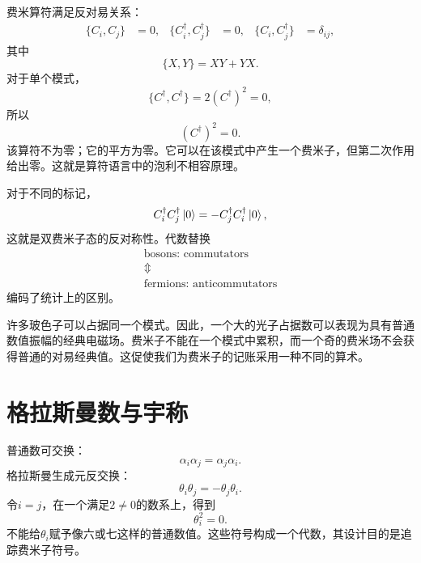 费米算符满足反对易关系：
\begin{align}
\{C_i,C_j\}&=0,&
\{C_i^\dagger,C_j^\dagger\}&=0,&
\{C_i,C_j^\dagger\}&=\delta_{ij},
\end{align}
其中
\begin{equation}
\{X,Y\}=XY+YX.
\end{equation}
对于单个模式，
\begin{equation}
\{C^\dagger,C^\dagger\}=2(C^\dagger)^2=0,
\end{equation}
所以
\begin{equation}
(C^\dagger)^2=0.
\end{equation}
该算符不为零；它的平方为零。它可以在该模式中产生一个费米子，但第二次作用给出零。这就是算符语言中的泡利不相容原理。

对于不同的标记，
\begin{equation}
C_i^\dagger C_j^\dagger\left\lvert0\right\rangle
=-C_j^\dagger C_i^\dagger\left\lvert0\right\rangle,
\end{equation}
这就是双费米子态的反对称性。代数替换
\begin{equation}
\begin{gathered}
\text{bosons: commutators}\\
\Updownarrow\\
\text{fermions: anticommutators}
\end{gathered}
\end{equation}
编码了统计上的区别。

许多玻色子可以占据同一个模式。因此，一个大的光子占据数可以表现为具有普通数值振幅的经典电磁场。费米子不能在一个模式中累积，而一个奇的费米场不会获得普通的对易经典值。这促使我们为费米子的记账采用一种不同的算术。

\section{格拉斯曼数与宇称}

普通数可交换：
\begin{equation}
\alpha_i\alpha_j=\alpha_j\alpha_i.
\end{equation}
格拉斯曼生成元反交换：
\begin{equation}
\theta_i\theta_j=-\theta_j\theta_i.
\end{equation}
令\(i=j\)，在一个满足\(2\neq0\)的数系上，得到
\begin{equation}
\theta_i^2=0.
\end{equation}
不能给\(\theta_i\)赋予像六或七这样的普通数值。这些符号构成一个代数，其设计目的是追踪费米子符号。

